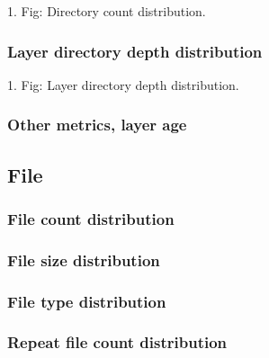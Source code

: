 1. Fig: Directory count distribution.

\subsubsection{Layer directory depth distribution}

1. Fig: Layer directory depth distribution.

\subsubsection{Other metrics, layer age}

\subsection{File}

\subsubsection{File count distribution}

\subsubsection{File size distribution}

\subsubsection{File type distribution}

\subsubsection{Repeat file count distribution}